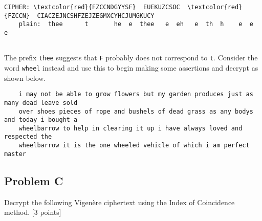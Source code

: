 \documentclass[../hw_sols.tex]{subfiles}
\begin{document}
\begin{solution}
\begin{BVerbatim}[commandchars=\\\{\}]
    CIPHER: \textcolor{red}{FZCCNDGYYSF}  EUEKUZCSOC  \textcolor{red}{FZCCN}  CIACZEJNCSHFZEJZEGMXCYHCJUMGKUCY
    plain:  thee      t       he  e  thee   e  eh   e  th  h    e  e      e
	
\end{BVerbatim}

The prefix \verb|thee| suggests that \verb|F| probably does not correspond to 
\verb|t|. Consider the word {\color{red}\verb|wheel|} instead and use this to 
begin making some assertions and decrypt as shown below.

\begin{verbatim}
    i may not be able to grow flowers but my garden produces just as many dead leave sold 
    over shoes pieces of rope and bushels of dead grass as any bodys and today i bought a 
    wheelbarrow to help in clearing it up i have always loved and respected the 
    wheelbarrow it is the one wheeled vehicle of which i am perfect master
\end{verbatim}

\end{solution}


\newpage



\subsection*{Problem C}

Decrypt the following Vigenère ciphertext using the Index of Coincidence 
method. [3 points]

\end{document}
